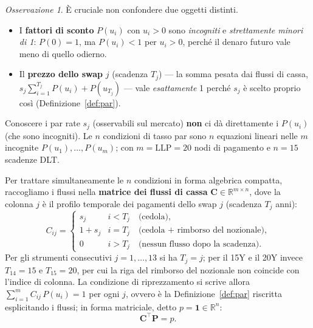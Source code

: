 \documentclass[11pt,a4paper]{article}
\theoremstyle{plain}
\theoremstyle{definition}
\theoremstyle{remark}
\newtheorem*{osservazione}{Osservazione}
\newcommand{\LLP}{\ensuremath{\mathrm{LLP}}}
\newcommand{\transp}{^{\!\top}}
\begin{document}
\begin{osservazione}
\label{oss:pari}
\`E cruciale non confondere due oggetti distinti.
\begin{itemize}
  \item I \textbf{fattori di sconto} $P(u_i)$ con $u_i > 0$ sono \emph{incogniti} e
        \emph{strettamente minori di 1}: $P(0)=1$, ma $P(u_i) < 1$ per $u_i>0$, perch\'e il
        denaro futuro vale meno di quello odierno.
  \item Il \textbf{prezzo dello swap} $j$ (scadenza $T_j$) --- la somma pesata dai flussi di
        cassa, $s_j\sum_{i=1}^{T_j}P(u_i)+P(u_{T_j})$ --- vale \emph{esattamente} 1
        perch\'e $s_j$ \`e scelto proprio cos\`i (Definizione~\ref{def:par}).
\end{itemize}
Conoscere i par rate $s_j$ (osservabili sul mercato) \textbf{non} ci d\`a direttamente i
$P(u_i)$ (che sono incogniti). Le $n$ condizioni di tasso par sono $n$ equazioni lineari nelle $m$
incognite $P(u_1),\ldots,P(u_m)$; con $m = \LLP = 20$ nodi di pagamento e $n = 15$ scadenze
DLT. 
\end{osservazione}

Per trattare simultaneamente le $n$ condizioni in forma algebrica compatta, raccogliamo i
flussi nella \textbf{matrice dei flussi di cassa} $\mathbf{C}\in\mathbb{R}^{m\times n}$,
dove la colonna $j$ \`e il profilo temporale dei pagamenti dello swap $j$ (scadenza $T_j$ anni):
\[
  C_{ij} =
  \begin{cases}
    s_j     & i < T_j \quad\text{(cedola),}\\
    1 + s_j & i = T_j \quad\text{(cedola + rimborso del nozionale),}\\
    0        & i > T_j \quad\text{(nessun flusso dopo la scadenza).}
  \end{cases}
\]
Per gli strumenti consecutivi $j=1,\ldots,13$ si ha $T_j=j$; per il 15Y e il 20Y invece
$T_{14}=15$ e $T_{15}=20$, per cui la riga del rimborso del nozionale non coincide con
l'indice di colonna.
La condizione di riprezzamento si scrive allora $\sum_{i=1}^{m} C_{ij}\,P(u_i) = 1$ per ogni
$j$, ovvero \`e la Definizione~\ref{def:par} riscritta esplicitando i flussi; in forma matriciale,
detto $p = \mathbf{1} \in \mathbb{R}^n$:
\[
  \mathbf{C}\transp \mathbf{P} = p .
\]
\end{document}
